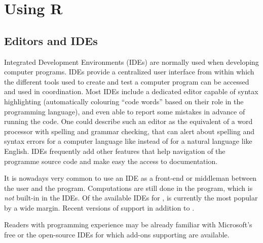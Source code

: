 \documentclass[krantz2]{krantz}\usepackage{knitr}
\begin{document}
\section{Using R}\label{sec:intro:using:R}

\subsection{Editors and IDEs}
Integrated Development Environments (IDEs) are normally used when developing computer programs. IDEs provide a centralized user interface from within which the different tools used to create and test a computer program can be accessed and used in coordination. Most IDEs include a dedicated editor capable of syntax highlighting (automatically colouring ``code words'' based on their role in the programming language), and even able to report some mistakes in advance of running the code. One could describe such an editor as the equivalent of a word processor with spelling and grammar checking, that can alert about spelling and syntax errors for a computer language like \Rlang instead of for a natural language like English. IDEs frequently add other features that help navigation of the programme source code and make easy the access to documentation.

It is nowadays very common to use an IDE as a front-end or middleman between the user and the \Rpgrm program. Computations are still done in the \Rpgrm program, which is \emph{not} built-in in the IDEs. Of the available IDEs for \Rpgrm, \RStudio is currently the most popular by a wide margin. Recent versions of \RStudio support \pythonlang in addition to \Rlang.

\begin{explainbox}
  Readers with programming experience may be already familiar with Microsoft's free  or the open-source  IDEs for which add-ons supporting \Rpgrm are available.
\end{explainbox}
\end{document}
